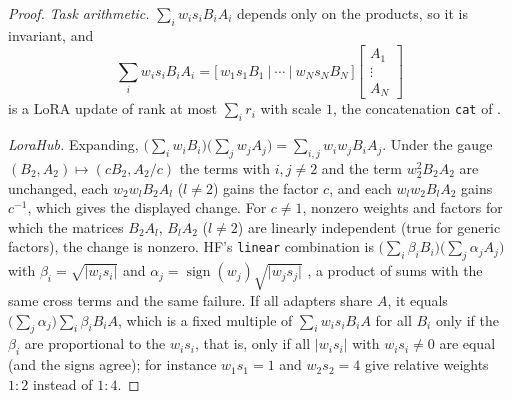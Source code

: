 \begin{proof}
\emph{Task arithmetic.} $\sum_iw_is_iB_iA_i$ depends only on the products, so it is invariant, and
\[\sum_iw_is_iB_iA_i=\big[\,w_1s_1B_1\ \big|\ \cdots\ \big|\ w_Ns_NB_N\,\big]\begin{bmatrix}A_1\\ \vdots\\ A_N\end{bmatrix}\]
is a LoRA update of rank at most $\sum_ir_i$ with scale $1$, the concatenation \texttt{cat} of .

\emph{LoraHub.} Expanding, $\big(\sum_iw_iB_i\big)\big(\sum_jw_jA_j\big)=\sum_{i,j}w_iw_jB_iA_j$. Under the gauge
$(B_2,A_2)\mapsto(cB_2,A_2/c)$ the terms with $i,j\ne2$ and the term $w_2^2B_2A_2$ are unchanged, each $w_2w_lB_2A_l$ ($l\ne2$) gains the factor $c$,
and each $w_lw_2B_lA_2$ gains $c^{-1}$, which gives the displayed change. For $c\ne1$, nonzero weights and factors for which
the matrices $B_2A_l$, $B_lA_2$ ($l\ne2$) are linearly independent (true for generic factors), the change is nonzero. HF's
\texttt{linear} combination is $\big(\sum_i\beta_iB_i\big)\big(\sum_j\alpha_jA_j\big)$ with $\beta_i=\sqrt{\lvert w_is_i\rvert}$
and $\alpha_j=\operatorname{sign}(w_j)\sqrt{\lvert w_js_j\rvert}$ \citep{xmangrulkar2022peft}, a product of sums with the same
cross terms and the same failure. If all adapters share $A$, it equals $\big(\sum_j\alpha_j\big)\sum_i\beta_iB_iA$, which is a
fixed multiple of $\sum_iw_is_iB_iA$ for all $B_i$ only if the $\beta_i$ are proportional to the $w_is_i$, that is, only if all
$\lvert w_is_i\rvert$ with $w_is_i\ne0$ are equal (and the signs agree); for instance $w_1s_1=1$ and $w_2s_2=4$ give relative
weights $1:2$ instead of $1:4$.


\end{proof}
